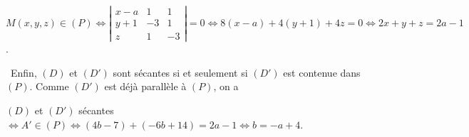 {{\begin{center}
$M(x,y,z)\in(P)\Leftrightarrow
\left|
\begin{array}{ccc}
x-a&1&1\\
y+1&-3&1\\
z&1&-3
\end{array}\right|=0\Leftrightarrow 8(x-a)+4(y+1)+4z=0\Leftrightarrow2x+y+z=2a-1$.
\end{center}
\textbullet~Enfin, $(D)$ et $(D')$ sont sécantes si et seulement si $(D')$ est contenue dans $(P)$. Comme $(D')$ est déjà parallèle à $(P)$, on a

\begin{center}
$(D)$ et $(D')$ sécantes $\Leftrightarrow A'\in(P)\Leftrightarrow(4b-7)+(-6b+14)=2a-1\Leftrightarrow b=-a+4$.
\end{center}

\begin{center}
\end{center}
}
}
